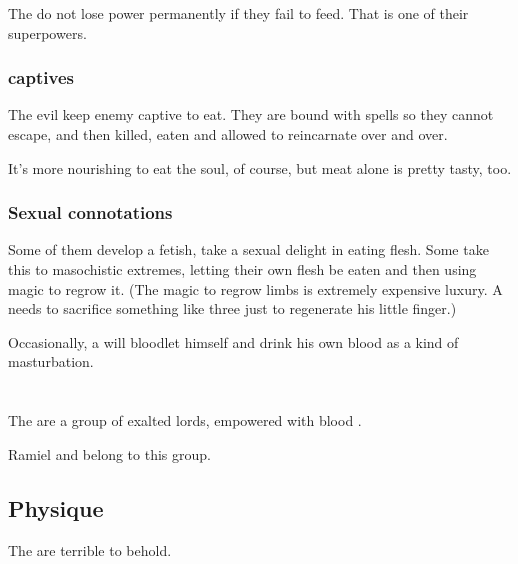 The \Malachim{} do not lose power permanently if they fail to feed. That is one of their superpowers. 




\subsubsection{\Resphan{} captives}
The evil \resphain{} keep enemy \resphain{} captive to eat. 
They are bound with spells so they cannot escape, and then killed, eaten and allowed to reincarnate over and over. 

It's more nourishing to eat the soul, of course, but \resphan{} meat alone is pretty tasty, too. 





\subsubsection{Sexual connotations}
Some of them develop a  fetish, take a sexual delight in eating flesh. Some take this to masochistic extremes, letting their own flesh be eaten and then using magic to regrow it. (The magic to regrow limbs is extremely expensive luxury. A \resphan{} needs to sacrifice something like three \humans{} just to regenerate his little finger.) 

Occasionally, a \resphan{} will bloodlet himself and drink his own blood as a kind of masturbation.

















\section{\Satharioth}
The \satharioth{} are a group of exalted \resphan{} lords, empowered with \draconic{} blood . 

Ramiel and \Shiaraid{} belong to this group.









\subsection{Physique}
The \satharioth{} are terrible to behold. 

